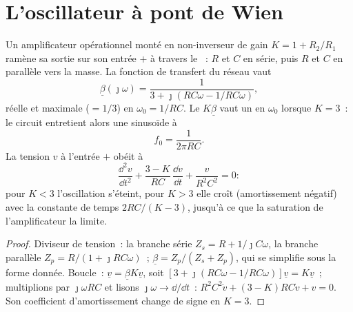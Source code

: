 \section{L'oscillateur à pont de Wien}

\begin{proposition}\label{prop:b2:feedback-oscillators:wien}
Un amplificateur opérationnel monté en non-inverseur de gain $K = 1 + R_2/R_1$
ramène sa sortie sur son entrée $+$ à travers le \emph{}~:
$R$ et $C$ en série, puis $R$ et $C$ en parallèle vers la masse. La
fonction de transfert du réseau vaut
\[
\underline\beta(\jmath\omega) = \frac1{3 + \jmath(RC\omega - 1/RC\omega)} ,
\]
réelle et maximale ($= 1/3$) en $\omega_0 = 1/RC$. Le  $K\underline\beta$
vaut un en $\omega_0$ lorsque $K = 3$~: le circuit entretient alors une
sinusoïde à
\[
f_0 = \frac1{2\pi RC} .
\]
La tension $v$ à l'entrée $+$ obéit à
\[
\frac{\dd^2v}{\dd t^2} + \frac{3 - K}{RC}\,\frac{\dd v}{\dd t} + \frac{v}{R^2C^2} = 0 :
\]
pour $K < 3$ l'oscillation s'éteint, pour $K > 3$ elle croît (amortissement
négatif) avec la constante de temps $2RC/(K - 3)$, jusqu'à ce que la
saturation de l'amplificateur la limite.
\end{proposition}

\begin{proof}
Diviseur de tension~: la branche série $Z_s = R + 1/\jmath C\omega$, la branche
parallèle $Z_p = R/(1 + \jmath RC\omega)$~; $\underline\beta = Z_p/(Z_s + Z_p)$, qui
se simplifie sous la forme donnée. Boucle~: $\underline v = \underline\beta K\underline v$, soit
$[3 + \jmath(RC\omega - 1/RC\omega)]\underline v = K\underline v$~; multiplions par $\jmath\omega RC$
et lisons $\jmath\omega \to \dd/\dd t$~: $R^2C^2\ddot v + (3 - K)RC\dot v + v = 0$.
Son coefficient d'amortissement change de signe en $K = 3$.
\end{proof}

